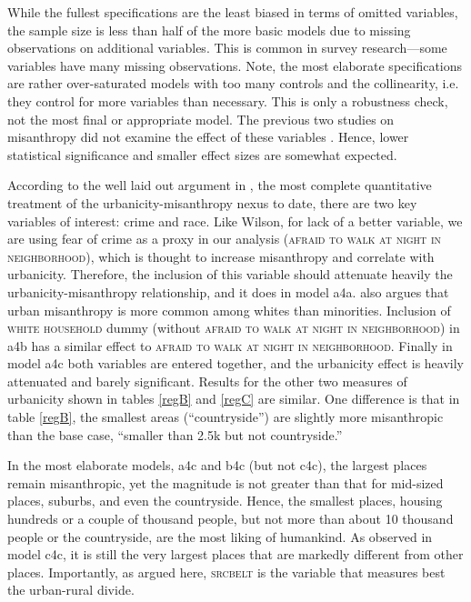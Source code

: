 \documentclass[11pt, letterpaper]{article}
\begin{document}
\begin{spacing}{1.4}
While the fullest specifications are the least biased in terms of omitted
variables, the sample size is less than half of the more basic models due to
missing observations on additional variables. This is common in survey
research---some variables have many missing observations. 
Note, the most elaborate specifications are rather over-saturated models with
too many controls and the collinearity, i.e. they control for more variables
than necessary. This is only a robustness check, not the most final or
appropriate model. The previous two studies on misanthropy did not examine the
effect of these variables \citep{wilson85,smith97}.
Hence, lower statistical significance and smaller effect sizes are somewhat expected. 

According to the well laid out argument in \citet{wilson85},  the most complete
quantitative treatment of the urbanicity-misanthropy nexus to date, there
are two key variables of interest: crime and race. Like Wilson, for lack of a
better variable, we are using fear of crime as a proxy in our analysis
(\textsc{afraid to walk at night in neighborhood}), which is thought to increase
misanthropy and correlate with urbanicity. Therefore, the inclusion of this
variable should attenuate heavily the urbanicity-misanthropy relationship, and
it does in model a4a. \citet{wilson85} also argues that urban misanthropy is
more common among  whites than minorities. Inclusion of \textsc{white household} dummy 
 (without \textsc{afraid to walk at night in neighborhood}) in a4b has a similar effect to \textsc{afraid to walk at night in neighborhood}. 
 Finally in model a4c both variables are entered together, and the urbanicity effect is heavily attenuated and barely significant. Results for the other two measures of urbanicity shown in tables \ref{regB} and \ref{regC} are similar. One difference is that in table \ref{regB}, the smallest areas (``countryside'') are slightly more misanthropic than the base case, ``smaller than 2.5k but not countryside.''

In the most elaborate models, a4c and b4c  (but not c4c), the largest places remain misanthropic, yet the magnitude is not greater than that for mid-sized places, suburbs, and even the countryside. Hence, the smallest places, housing hundreds or a couple of thousand people, but not more than about
10 thousand people or the countryside, are the most liking of humankind. As observed in model c4c, it is still the very largest places that are markedly different from other places. Importantly, as argued here, \textsc{srcbelt} is the variable that measures best the urban-rural divide. 


\end{spacing}
\end{document}
